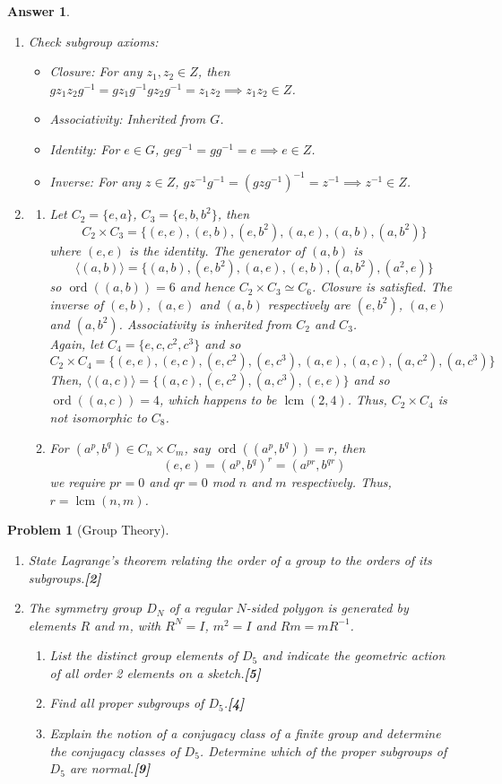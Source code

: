 \documentclass[a4paper]{article}
\DeclareMathOperator{\ord}{ord}
\DeclareMathOperator{\lcm}{lcm}
\newtheorem{ans}{Answer}[section]
\theoremstyle{new}
\newtheorem{qns}{Problem}[section]
\begin{document}
\begin{ans}\leavevmode
\begin{enumerate}[label=(\roman*)]
\item Check subgroup axioms:
\begin{itemize}
    \item Closure: For any $z_1,z_2\in Z$, then $gz_1z_2g^{-1}=gz_1g^{-1}gz_2g^{-1}=z_1z_2\implies z_1z_2\in Z$.
    \item Associativity: Inherited from $G$.
    \item Identity: For $e\in G$, $geg^{-1}=gg^{-1}=e\implies e\in Z$.
    \item Inverse: For any $z\in Z$, $gz^{-1}g^{-1}=(gzg^{-1})^{-1}=z^{-1}\implies z^{-1}\in Z$.
\end{itemize}
\item 
\begin{enumerate}[label=(\alph*)]
\item Let $C_2=\{e,a\}$, $C_3=\{e,b,b^2\}$, then
$$C_2\times C_3=\{(e,e),(e,b),(e,b^2),(a,e),(a,b),(a,b^2)\}$$
where $(e,e)$ is the identity. The generator of $(a,b)$ is
$$\langle(a,b)\rangle=\{(a,b),(e,b^2),(a,e),(e,b),(a,b^2),(a^2,e)\}$$
so $\ord((a,b))=6$ and hence $C_2\times C_3\simeq C_6$. Closure is satisfied. The inverse of $(e,b)$, $(a,e)$ and $(a,b)$ respectively are $(e,b^2)$, $(a,e)$ and $(a,b^2)$. Associativity is inherited from $C_2$ and $C_3$.\\[5pt]
Again, let $C_4=\{e,c,c^2,c^3\}$ and so
$$C_2\times C_4=\{(e,e),(e,c),(e,c^2),(e,c^3),(a,e),(a,c),(a,c^2),(a,c^3)\}$$
Then, $\langle (a,c)\rangle=\{(a,c),(e,c^2),(a,c^3),(e,e)\}$ and so $\ord((a,c))=4$, which happens to be $\lcm(2,4)$. Thus, $C_2\times C_4$ is not isomorphic to $C_8$.
\item For $(a^p,b^q)\in C_n\times C_m$, say $\ord((a^p,b^q))=r$, then 
$$(e,e)=(a^p,b^q)^r=(a^{pr},b^{qr})$$
we require $pr=0$ and $qr=0$ mod $n$ and $m$ respectively. Thus, $r=\lcm(n,m)$.
\end{enumerate}
\end{enumerate}
\end{ans}
\newpage
\begin{qns}[Group Theory]\leavevmode
\begin{enumerate}[label=(\roman*)]
\item State Lagrange’s theorem relating the order of a group to the orders of its subgroups.\hfill\textbf{[2]}
\item The symmetry group $D_N$ of a regular $N$-sided polygon is generated by elements $R$ and $m$, with $R^N= I$, $m^2 = I$ and $Rm = mR^{−1}$.
\begin{enumerate}[label=(\alph*)]
\item List the distinct group elements of $D_5$ and indicate the geometric action of all order 2 elements on a sketch.\hfill\textbf{[5]}
\item Find all proper subgroups of $D_5$.\hfill\textbf{[4]}
\item Explain the notion of a conjugacy class of a finite group and determine the conjugacy classes of $D_5$. Determine which of the proper subgroups of $D_5$ are normal.\hfill\textbf{[9]}
\end{enumerate}
\end{enumerate}
\end{qns}
\end{document}
